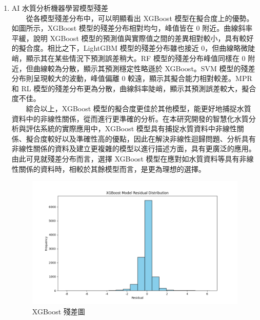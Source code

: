 \documentclass[12pt,a4paper]{article}
\begin{document}
\begin{enumerate}
\begin{enumerate}[label=\arabic*.]
\begin{enumerate}[label=3-2-\arabic*.]
            \begin{enumerate}[label=\Alph*.]
                \item AI 水質分析機器學習模型殘差\\
                　　從各模型殘差分布中，可以明顯看出 XGBoost 模型在擬合度上的優勢。如圖所示，XGBoost 模型的殘差分布相對均勻，峰值皆在 0 附近。曲線斜率平緩，說明 XGBoost 模型的預測值與實際值之間的差異相對較小，具有較好的擬合度。相比之下，LightGBM 模型的殘差分布雖也接近 0，但曲線略微陡峭，顯示其在某些情況下預測誤差稍大。RF 模型的殘差分布峰值同樣在 0 附近，但曲線較為分散，顯示其預測穩定性略遜於 XGBoost。SVM 模型的殘差分布則呈現較大的波動，峰值偏離 0 較遠，顯示其擬合能力相對較差。MPR 和 RL 模型的殘差分布更為分散，曲線斜率陡峭，顯示其預測誤差較大，擬合度不佳。\\
                　　綜合以上，XGBoost 模型的擬合度更佳於其他模型，能更好地捕捉水質資料中的非線性關係，從而進行更準確的分析。在本研究開發的智慧化水質分析與評估系統的實際應用中，XGBoost 模型具有捕捉水質資料中非線性關係、擬合度較好以及準確性高的優點，因此在解決非線性迴歸問題、分析具有非線性關係的資料及建立更複雜的模型以進行描述方面，具有更廣泛的應用。由此可見就殘差分布而言，選擇 XGBoost 模型在應對如水質資料等具有非線性關係的資料時，相較於其餘模型而言，是更為理想的選擇。
                    \begin{figure}[H]
                        \centering
                        \begin{minipage}{0.45\textwidth}
                            \centering
                            \includegraphics[width=\textwidth]{resources/image/ResidualPlot/XGBoost.png}
                            \caption{XGBoost 殘差圖}
                            \label{fig:residual_xgboost}
                        \end{minipage}
                        \begin{minipage}{0.45\textwidth}

\end{minipage}
\end{figure}
\end{enumerate}
\end{enumerate}
\end{enumerate}
\end{enumerate}
\end{document}
